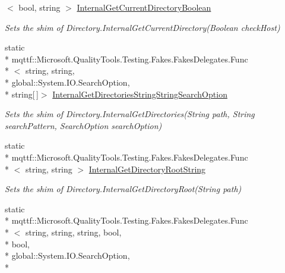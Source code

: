 \begin{DoxyCompactItemize}
$<$ bool, string $>$ \hyperlink{class_system_1_1_i_o_1_1_fakes_1_1_shim_directory_a527b47bfda34a6859dc470555d97b8e2}{Internal\-Get\-Current\-Directory\-Boolean}
\begin{DoxyCompactList}\small\item\em Sets the shim of Directory.\-Internal\-Get\-Current\-Directory(\-Boolean check\-Host)\end{DoxyCompactList}\item 
static \\*
mqttf\-::\-Microsoft.\-Quality\-Tools.\-Testing.\-Fakes.\-Fakes\-Delegates.\-Func\\*
$<$ string, string, \\*
global\-::\-System.\-I\-O.\-Search\-Option, \\*
string\mbox{[}$\,$\mbox{]}$>$ \hyperlink{class_system_1_1_i_o_1_1_fakes_1_1_shim_directory_a83bd0ba2df431bfab26352f3d8869277}{Internal\-Get\-Directories\-String\-String\-Search\-Option}
\begin{DoxyCompactList}\small\item\em Sets the shim of Directory.\-Internal\-Get\-Directories(\-String path, String search\-Pattern, Search\-Option search\-Option)\end{DoxyCompactList}\item 
static \\*
mqttf\-::\-Microsoft.\-Quality\-Tools.\-Testing.\-Fakes.\-Fakes\-Delegates.\-Func\\*
$<$ string, string $>$ \hyperlink{class_system_1_1_i_o_1_1_fakes_1_1_shim_directory_a99c071d4e976b8c39eb178c425e9a0e5}{Internal\-Get\-Directory\-Root\-String}
\begin{DoxyCompactList}\small\item\em Sets the shim of Directory.\-Internal\-Get\-Directory\-Root(\-String path)\end{DoxyCompactList}\item 
static \\*
mqttf\-::\-Microsoft.\-Quality\-Tools.\-Testing.\-Fakes.\-Fakes\-Delegates.\-Func\\*
$<$ string, string, string, bool, \\*
bool, \\*
global\-::\-System.\-I\-O.\-Search\-Option, \\*

\end{DoxyCompactItemize}

